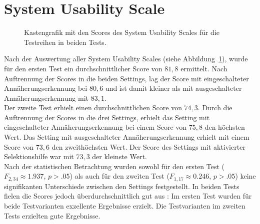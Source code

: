 \documentclass[12pt,numbers=noenddot,parskip,bibliography=totocnumbered,listof=totocnumbered]{scrreprt}
\begin{document}
\section{System Usability Scale}
\begin{figure}
\centering
{}%
\hfill
{}%
\caption{Kastengrafik mit den Scores des System Usability Scales für die Testreihen in beiden Tests.}
\label{ergebnisSUS}
\end{figure}
Nach der Auswertung aller System Usability Scales (siehe Abbildung~\ref{ergebnisSUS}), wurde für den ersten Test ein durchschnittlicher Score von $81{,}8$ ermittelt. Nach Auftrennung der Scores in die beiden Settings, lag der Score mit eingeschalteter Annäherungserkennung bei $80{,}6$ und ist damit kleiner als mit ausgeschalteter Annäherungserkennung mit $83{,}1$.\\
Der zweite Test erhielt einen durchschnittlichen Score von $74{,}3$. Durch die Auftrennung der Scores in die drei Settings, erhielt das Setting mit eingeschalteter Annäherungserkennung bei einem Score von $75{,}8$ den höchsten Wert. Das Setting mit ausgeschalteter Annäherungserkennung erhielt mit einem Score von $73{,}6$ den zweithöchsten Wert. Der Score des Settings mit aktivierter Selektionshilfe war mit $73{,}3$ der kleinste Wert.\\
Nach der statistischen Betrachtung wurden sowohl für den ersten Test ($F_{2,34}\approx 1.937$, $p > .05$) als auch für den zweiten Test ($F_{1,17}\approx 0.246$, $p > .05$) keine signifikanten Unterschiede zwischen den Settings festgestellt. In beiden Tests fielen die Scores jedoch überdurchschnittlich gut aus \citep{sus2013}: Im ersten Test wurden für beide Testvarianten exzellente Ergebnisse erzielt. Die Testvarianten im zweiten Tests erzielten gute Ergebnisse.
\end{document}
